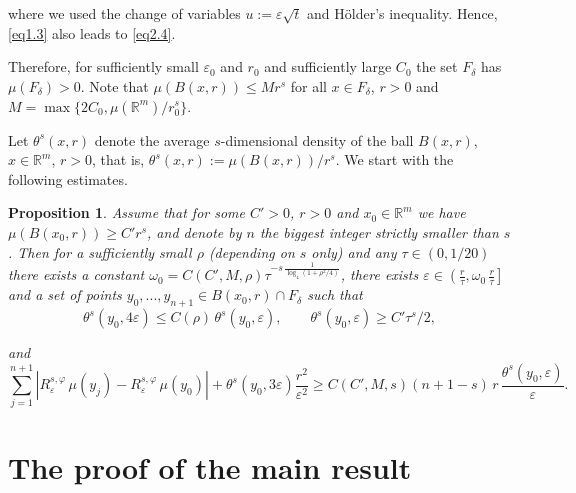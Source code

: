 \documentclass{elsart3-1}
\newcommand{\RR}{{\mathbb{R}}}
\newcommand{\eps}{\varepsilon}
\newcommand{\todo}[1]{\vspace{5 mm}\par \noindent
\marginpar{\textsc{}} \framebox{\begin{minipage}[c]{0.95
\textwidth} \tt #1
\end{minipage}}\vspace{5 mm}\par}
\newtheorem{proposition}[theoreme]{Proposition}
\begin{document}
\noindent where we used the change of variables $u:=\eps\sqrt t$ and H\"older's inequality. Hence, \eqref{eq1.3} also leads to \eqref{eq2.4}.

 Therefore, for sufficiently small $\eps_0$ and $r_0$ and sufficiently large $C_0$ the set $F_\delta$ has $\mu(F_{\delta})>0$. 
Note that $\mu (B(x,r))\leq Mr^s$ for all $x\in F_\delta$, $r>0$ and $M=\max\{2C_0,\mu(\RR^m)/r_0^s\}$. 

Let $\theta^s(x,r)$ denote  the average $s$-dimensional density of the ball $B(x,r)$, $x\in\RR^m$, $r>0$, that is, 
$\theta^s(x,r):=\mu(B(x,r))/r^s$. We start with the following estimates.

\begin{proposition}\cite{RdVTolsa} \label{p2.1}
Assume that for some $C'>0$, $r>0$ and $x_0\in\RR^m$ we have 
$\mu(B(x_0,r))\geq C'r^s$, and denote by $n$ the biggest integer strictly smaller than $s$. Then for a sufficiently small $\rho$ (depending on $s$ only) and any $\tau\in (0,1/20)$ there exists a constant $\omega_0=C(C',M,\rho)\tau^{-s\,\frac {1}{\log_4(1+\rho^2/4)}}$, there exists $\eps\in\left(\frac r\tau, \omega_0\,\frac r\tau\right]$ and a set of points $y_0,...,y_{n+1}\in B(x_0,r)\cap F_{\delta}$ such that 
\begin{equation}\label{eq2.9}
\theta^s(y_0,4\eps)\leq C(\rho)\,\theta^s(y_0,\eps),\qquad \theta^s(y_0,\eps)\geq C'\tau^s/2,
\end{equation}

\noindent and 
\begin{equation}\label{eq2.7}
\sum_{j=1}^{n+1}|R^{s,\varphi}_{\eps}\,\mu(y_j)-R^{s,\varphi}_{\eps}\,\mu(y_0)|+\theta^s(y_0, 3\eps)\frac{r^2}{\eps^2}\geq C(C',M,s)(n+1-s)\,r\,\frac{\theta^s(y_0,\eps)}{\eps}.
\end{equation}
\end{proposition}

\section{The proof of the main result}

 
\end{document}
